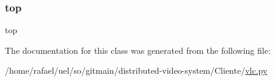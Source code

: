 \mbox{\label{classvlc_1_1_video_orient_a8aab264665f2085687d9eeca4c67a691}} 
\subsubsection{\texorpdfstring{top}{top}}
{\footnotesize\ttfamily top\hspace{0.3cm}{\ttfamily [static]}}



The documentation for this class was generated from the following file\+:\begin{DoxyCompactItemize}
\item 
/home/rafael/uel/so/gitmain/distributed-\/video-\/system/\+Cliente/\hyperlink{vlc_8py}{vlc.\+py}\end{DoxyCompactItemize}
